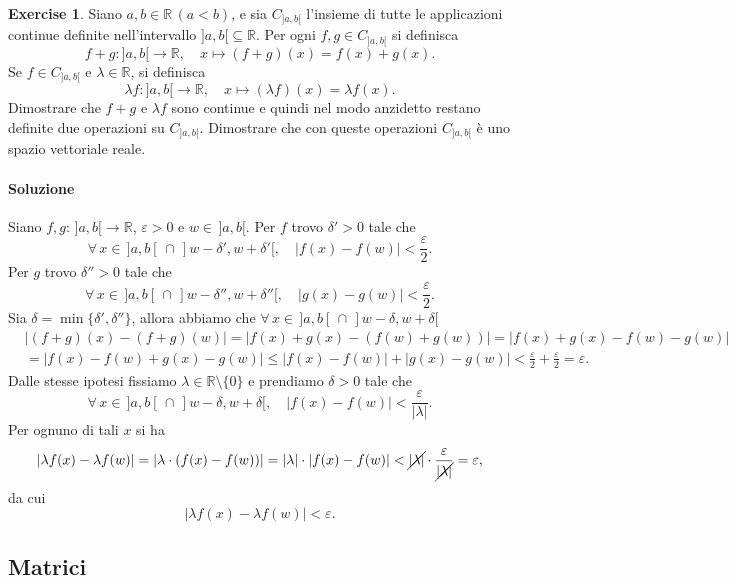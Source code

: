 \documentclass{article}
\theoremstyle{plain}
\theoremstyle{definition}
\newtheorem{xca}[exmp]{Exercise}
\theoremstyle{remark}
\begin{document}
\vspace{10pt}

\begin{bxthm}
\begin{xca}
    Siano $a,b\in\mathbb{R}\,(a<b)$, e sia $C_{]a,b[}$ l'insieme di tutte le applicazioni continue definite nell'intervallo $]a,b[\subseteq\mathbb{R}$.
    Per ogni $f,g\in C_{]a,b[}$ si definisca 
    \[f+g:]a,b[\to\mathbb{R},\quad x\mapsto (f+g)(x)=f(x)+g(x).\]
    Se $f\in C_{]a,b[}$ e $\lambda\in\mathbb{R}$, si definisca 
    \[\lambda f:]a,b[\to\mathbb{R},\quad x\mapsto (\lambda f)(x)=\lambda f(x).\]
    Dimostrare che $f+g$ e $\lambda f$ sono continue e quindi nel modo anzidetto restano definite due operazioni su $C_{]a,b[}$.
    Dimostrare che con queste operazioni $C_{]a,b[}$ è uno spazio vettoriale reale.
\end{xca}
\end{bxthm}
\paragraph{Soluzione}
Siano $f,g:\,]a,b[\to\mathbb{R}$, $\varepsilon>0$ e $w\in\, ]a,b[$.
Per $f$ trovo $\delta'>0$ tale che 
\[\forall\, x\in\, ]a,b[\,\cap\, ]w-\delta',w+\delta'[,\quad |f(x)-f(w)|<\dfrac{\varepsilon}{2}.\]
Per $g$ trovo $\delta''>0$ tale che 
\[\forall\, x\in\, ]a,b[\,\cap\,]w-\delta'',w+\delta''[,\quad |g(x)-g(w)|<\dfrac{\varepsilon}{2}.\]
Sia $\delta=\min\{\delta',\delta''\}$, allora abbiamo che $\forall\, x\in\, ]a,b[\,\cap\, ]w-\delta,w+\delta[$
\begin{align*}
    &|(f+g)(x)-(f+g)(w)|=|f(x)+g(x)-(f(w)+g(w))|=|f(x)+g(x)-f(w)-g(w)|\\
    &=|f(x)-f(w)+g(x)-g(w)|\leq |f(x)-f(w)|+|g(x)-g(w)|<\frac{\varepsilon}{2}+\frac{\varepsilon}{2}=\varepsilon.
\end{align*}
Dalle stesse ipotesi fissiamo $\lambda\in\mathbb{R}\setminus\{0\}$ e prendiamo $\delta>0$ tale che 
\[\forall\, x\in \, ]a,b[\,\cap\, ]w-\delta,w+\delta[,\quad|f(x)-f(w)|<\dfrac{\varepsilon}{|\lambda|}.\]
Per ognuno di tali $x$ si ha 
\[ |\lambda f(x)-\lambda f(w)|=|\lambda \cdot(f(x)-f(w))|=|\lambda |\cdot |f(x)-f(w)|<\cancel{|\lambda |}\cdot \frac{\varepsilon}{\cancel{|\lambda |}}=\varepsilon, \]
da cui \[|\lambda f(x)-\lambda f(w)|<\varepsilon.\]

\newpage
\subsection{Matrici}
\vspace{20pt}
\end{document}
